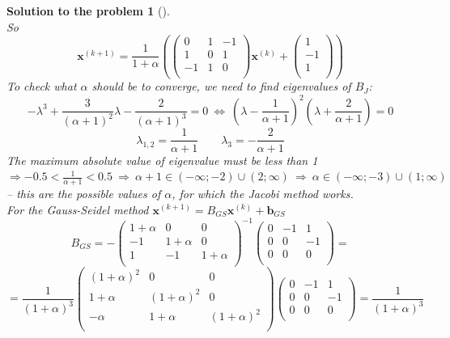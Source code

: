 \documentclass[12pt,a4]{article}
\newtheorem{solution}{Solution to the problem}
\newcommand{\bb}{{\mathbf b}}
\newcommand{\bx}{{\mathbf x}}
\begin{document}
\begin{solution}[]
\[\]
So
\[
\bx^{(k+1)}=\frac1{1+\alpha}\left(
\begin{pmatrix}
0 & 1 & -1\\
1 & 0 & 1\\
-1 & 1 & 0\\
\end{pmatrix}
\bx^{(k)}+
\begin{pmatrix} 1 \\ -1\\ 1 \\ \end{pmatrix}
\right)
\]
To check what $\alpha$ should be to converge, we need to find eigenvalues of $B_J$:
\[
-\lambda^3+\frac3{(\alpha+1)^2}\lambda-\frac2{(\alpha+1)^3} = 0
~\Leftrightarrow~
\left(\lambda-\frac1{\alpha+1}\right)^2\left(\lambda+\frac2{\alpha+1}\right)=0
\]
\[
\lambda_{1,2} = \frac1{\alpha+1}
\qquad
\lambda_{3} = -\frac2{\alpha+1}
\]
The maximum absolute value of eigenvalue must be less than 1 $
\Rightarrow -0.5<\frac1{\alpha+1}<0.5
~\Rightarrow~ {\alpha+1} \in (-\infty;-2) \cup (2;\infty)
~\Rightarrow~ \alpha \in (-\infty;-3) \cup (1;\infty)
$ -- this are the possible values of $\alpha$, for which the Jacobi method works.
\\
For the Gauss-Seidel method $\bx^{(k+1)}=B_{GS}\bx^{(k)}+\bb_{GS}$
\[
B_{GS} = -
\begin{pmatrix}
1+\alpha & 0 & 0\\
-1 & 1+\alpha & 0\\
1 & -1 & 1+\alpha\\
\end{pmatrix}^{-1}
\begin{pmatrix}
0 & -1 & 1\\
0 & 0 & -1\\
0 & 0 & 0\\
\end{pmatrix} =
\]
\[
= \frac{1}{(1+\alpha)^3}
\begin{pmatrix}
(1+\alpha)^2 & 0 & 0\\
1+\alpha     & (1+\alpha)^2 & 0\\
-\alpha      & 1+\alpha & (1+\alpha)^2\\
\end{pmatrix}
\begin{pmatrix}
0 & -1 & 1\\
0 & 0 & -1\\
0 & 0 & 0\\
\end{pmatrix}
= \frac{1}{(1+\alpha)^3}
\]
\end{solution}
\end{document}
